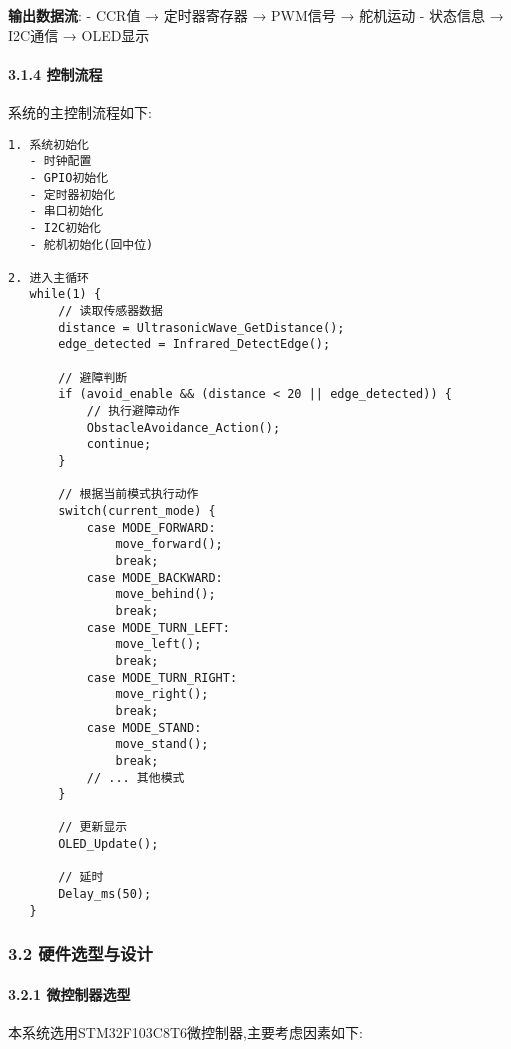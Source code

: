 \documentclass[
]{article}
\begin{document}
\textbf{输出数据流}: - CCR值 → 定时器寄存器 → PWM信号 → 舵机运动 -
状态信息 → I2C通信 → OLED显示

\hypertarget{ux63a7ux5236ux6d41ux7a0b}{%
\paragraph{3.1.4 控制流程}\label{ux63a7ux5236ux6d41ux7a0b}}

系统的主控制流程如下:

\begin{verbatim}
1. 系统初始化
   - 时钟配置
   - GPIO初始化
   - 定时器初始化
   - 串口初始化
   - I2C初始化
   - 舵机初始化(回中位)

2. 进入主循环
   while(1) {
       // 读取传感器数据
       distance = UltrasonicWave_GetDistance();
       edge_detected = Infrared_DetectEdge();
       
       // 避障判断
       if (avoid_enable && (distance < 20 || edge_detected)) {
           // 执行避障动作
           ObstacleAvoidance_Action();
           continue;
       }
       
       // 根据当前模式执行动作
       switch(current_mode) {
           case MODE_FORWARD:
               move_forward();
               break;
           case MODE_BACKWARD:
               move_behind();
               break;
           case MODE_TURN_LEFT:
               move_left();
               break;
           case MODE_TURN_RIGHT:
               move_right();
               break;
           case MODE_STAND:
               move_stand();
               break;
           // ... 其他模式
       }
       
       // 更新显示
       OLED_Update();
       
       // 延时
       Delay_ms(50);
   }
\end{verbatim}

\hypertarget{ux786cux4ef6ux9009ux578bux4e0eux8bbeux8ba1}{%
\subsubsection{3.2
硬件选型与设计}\label{ux786cux4ef6ux9009ux578bux4e0eux8bbeux8ba1}}

\hypertarget{ux5faeux63a7ux5236ux5668ux9009ux578b}{%
\paragraph{3.2.1
微控制器选型}\label{ux5faeux63a7ux5236ux5668ux9009ux578b}}

本系统选用STM32F103C8T6微控制器,主要考虑因素如下:
\end{document}
